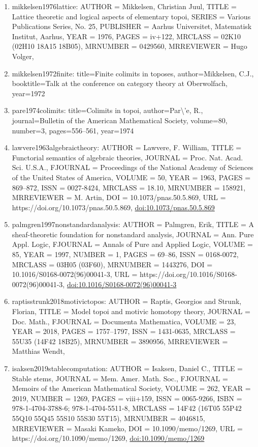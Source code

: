 \documentclass[11pt]{article}
\begin{document}
\begin{enumerate}[leftmargin=*]
  \item mikkelsen1976lattice: AUTHOR = Mikkelsen, Christian Juul, TITLE = Lattice theoretic and logical aspects of elementary topoi, SERIES = Various Publications Series, No. 25, PUBLISHER = Aarhus Universitet, Matematisk Institut, Aarhus, YEAR = 1976, PAGES = iv+122, MRCLASS = 02K10 (02H10 18A15 18B05), MRNUMBER = 0429560, MRREVIEWER = Hugo Volger,
  \item mikkelsen1972finite: title=Finite colimits in toposes, author=Mikkelsen, C.J., booktitle=Talk at the conference on category theory at Oberwolfach, year=1972
  \item pare1974colimits: title=Colimits in topoi, author=Par\textbackslash{}'e, R., journal=Bulletin of the American Mathematical Society, volume=80, number=3, pages=556--561, year=1974
  \item lawvere1963algebraictheory: AUTHOR = Lawvere, F. William, TITLE = Functorial semantics of algebraic theories, JOURNAL = Proc. Nat. Acad. Sci. U.S.A., FJOURNAL = Proceedings of the National Academy of Sciences of the United States of America, VOLUME = 50, YEAR = 1963, PAGES = 869--872, ISSN = 0027-8424, MRCLASS = 18.10, MRNUMBER = 158921, MRREVIEWER = M. Artin, DOI = 10.1073/pnas.50.5.869, URL = https://doi.org/10.1073/pnas.50.5.869, \href{https://doi.org/10.1073/pnas.50.5.869}{doi:10.1073/pnas.50.5.869}
  \item palmgren1997nonstandardanalysis: AUTHOR = Palmgren, Erik, TITLE = A sheaf-theoretic foundation for nonstandard analysis, JOURNAL = Ann. Pure Appl. Logic, FJOURNAL = Annals of Pure and Applied Logic, VOLUME = 85, YEAR = 1997, NUMBER = 1, PAGES = 69--86, ISSN = 0168-0072, MRCLASS = 03H05 (03F60), MRNUMBER = 1443276, DOI = 10.1016/S0168-0072(96)00041-3, URL = https://doi.org/10.1016/S0168-0072(96)00041-3, \href{https://doi.org/10.1016/S0168-0072(96)00041-3}{doi:10.1016/S0168-0072(96)00041-3}
  \item raptisstrunk2018motivictopos: AUTHOR = Raptis, Georgios and Strunk, Florian, TITLE = Model topoi and motivic homotopy theory, JOURNAL = Doc. Math., FJOURNAL = Documenta Mathematica, VOLUME = 23, YEAR = 2018, PAGES = 1757--1797, ISSN = 1431-0635, MRCLASS = 55U35 (14F42 18B25), MRNUMBER = 3890956, MRREVIEWER = Matthias Wendt,
  \item isaksen2019stablecomputation: AUTHOR = Isaksen, Daniel C., TITLE = Stable stems, JOURNAL = Mem. Amer. Math. Soc., FJOURNAL = Memoirs of the American Mathematical Society, VOLUME = 262, YEAR = 2019, NUMBER = 1269, PAGES = viii+159, ISSN = 0065-9266, ISBN = 978-1-4704-3788-6; 978-1-4704-5511-8, MRCLASS = 14F42 (16T05 55P42 55Q10 55Q45 55S10 55S30 55T15), MRNUMBER = 4046815, MRREVIEWER = Masaki Kameko, DOI = 10.1090/memo/1269, URL = https://doi.org/10.1090/memo/1269, \href{https://doi.org/10.1090/memo/1269}{doi:10.1090/memo/1269}

\end{enumerate}
\end{document}

